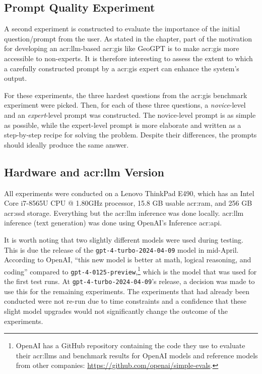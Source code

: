\subsection{Prompt Quality Experiment}
\label{subsec:prompt-quality-test-setup}

A second experiment is constructed to evaluate the importance of the initial question/prompt from the user. As stated in the  chapter, part of the motivation for developing an \acrshort{acr:llm}-based \acrshort{acr:gis} like GeoGPT is to make \acrshort{acr:gis} more accessible to non-experts. It is therefore interesting to assess the extent to which a carefully constructed prompt by a \acrshort{acr:gis} expert can enhance the system's output.

For these experiments, the three hardest questions from the \acrshort{acr:gis} benchmark experiment were picked. Then, for each of these three questions, a \textit{novice}-level and an \textit{expert}-level prompt was constructed. The novice-level prompt is as simple as possible, while the expert-level prompt is more elaborate and written as a step-by-step recipe for solving the problem. Despite their differences, the prompts should ideally produce the same answer.

\subsection[Hardware and LLM Version]{Hardware and \acrshort{acr:llm} Version}
\label{subsec:hardware-and-model-version}

All experiments were conducted on a Lenovo ThinkPad E490, which has an Intel{\textregistered} Core\texttrademark{} i7-8565U CPU @ 1.80GHz processor, 15.8 GB usable \acrshort{acr:ram}, and 256 GB \acrshort{acr:ssd} storage. Everything but the \acrshort{acr:llm} inference was done locally. \acrshort{acr:llm} inference (text generation) was done using OpenAI's Inference \acrshort{acr:api}.

It is worth noting that two slightly different models were used during testing. This is due the release of the \texttt{gpt-4-turbo-2024-04-09} model in mid-April. According to OpenAI, \enquote{this new model is better at math, logical reasoning, and coding} compared to \texttt{gpt-4-0125-preview},\footnote{OpenAI has a GitHub repository containing the code they use to evaluate their \glspl{acr:llm} and benchmark results for OpenAI models and reference models from other companies: \url{https://github.com/openai/simple-evals}.} which is the model that was used for the first test runs. At \texttt{gpt-4-turbo-2024-04-09}'s release, a decision was made to use this for the remaining experiments. The experiments that had already been conducted were not re-run due to time constraints and a confidence that these slight model upgrades would not significantly change the outcome of the experiments.


